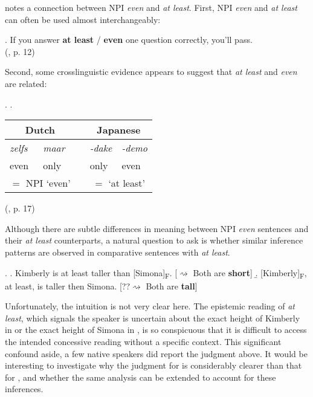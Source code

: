 \documentclass[12pt,letterpaper]{scrartcl}
\newcommand{\alignright}{\hspace*{\fill}}
\newcommand{\infer}{$\rightsquigarrow$ }
\newcommand{\sub}[1]{\textsubscript{#1}}
\begin{document}
\cite{rullmann_more_2009} notes a connection between NPI \textit{even} and \textit{at least}. First, NPI \textit{even} and \textit{at least} can often be used almost interchangeably:

\ex. If you answer \textbf{at least} / \textbf{even} one question correctly, you'll pass. \\ \alignright (\cite{rullmann_more_2009}, p. 12)

Second, some crosslinguistic evidence appears to suggest that \textit{at least} and \textit{even} are related:

\ex. \a. \begin{tabular}[t]{llp{1cm}ll}
\multicolumn{2}{c}{Dutch} & & \multicolumn{2}{c}{Japanese} \\\hline
\textit{zelfs} & \textit{maar} & & \textit{-dake} & \textit{-demo}\\
even & only & & only & even\\
\multicolumn{2}{c}{$=$ NPI `even'} & & \multicolumn{2}{c}{$=$ `at least'}
\end{tabular}
\alignright (\cite{rullmann_more_2009}, p. 17)

Although there are subtle differences in meaning between NPI \textit{even} sentences and their \textit{at least} counterparts, a natural question to ask is whether similar inference patterns are observed in comparative sentences with \textit{at least}. 

\ex. \label{at-least} \a. Kimberly is at least taller than [Simona]\sub{F}. \alignright [\infer Both are \textbf{short}] \label{neg-atleast} 
\b. [Kimberly]\sub{F}, at least, is taller then Simona. \alignright [??\infer Both are \textbf{tall}] \label{pos-atleast} 



Unfortunately, the intuition is not very clear here. The epistemic reading of \textit{at least}, which signals the speaker is uncertain about the exact height of Kimberly in \Next[a] or the exact height of Simona in \Next[b], is so conspicuous that it is difficult to access the intended concessive reading without a specific context. This significant confound aside, a few native speakers did report the judgment above. It would be interesting to investigate why the judgment for \Last[a] is considerably clearer than that for \Last[b], and whether the same analysis can be extended to account for these inferences. 
\end{document}
